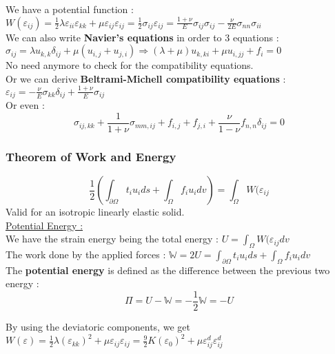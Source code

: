 \documentclass[../main.tex]{subfiles}
\begin{document}
We have a potential function : $W(\varepsilon_{ij}) = \frac{1}{2} \lambda \varepsilon_{ii} \varepsilon_{kk} + \mu \varepsilon_{ij} \varepsilon_{ij} = \frac{1}{2}\sigma_{ij} \varepsilon_{ij} = \frac{1+\nu}{E}\sigma_{ij}\sigma_{ij} - \frac{\nu}{2E}\sigma_{nn} \sigma_{ii} $\\

We can also write \textbf{Navier's equations} in order to 3 equations : $\sigma_{ij} = \lambda u_{k,k}\delta_{ij} + \mu(u_{i,j} + u_{j,i}) \Rightarrow (\lambda +\mu) u_{k,ki} + \mu u_{i,jj} + f_i = 0$\\
\warning No need anymore to check for the compatibility equations.\\


Or we can derive \textbf{Beltrami-Michell compatibility equations} : $\varepsilon_{ij} = -\frac{\nu}{E}\sigma_{kk} \delta_{ij} + \frac{1+\nu}{E}\sigma_{ij}$\\
Or even : \begin{equation}
    \sigma_{ij,kk} + \frac{1}{1+\nu} \sigma_{mm,ij} + f_{i,j} + f_{j,i} + \frac{\nu}{1-\nu} f_{n,n} \delta_{ij}=0
\end{equation}


\subsubsection{Theorem of Work and Energy}
\begin{equation}
    \frac{1}{2}(\int_{\partial \Omega} t_i u_i ds + \int_{\Omega} f_i u_i dv) = \int_\Omega W(\varepsilon_{ij}
\end{equation}
Valid for an isotropic linearly elastic solid.\\

\quad \underline{Potential Energy :}\\

We have the strain energy being the total energy : $U = \int_\Omega W(\varepsilon_{ij} dv$\\

The work done by the applied forces : $\mathbb{W} = 2U = \int_{\partial \Omega} t_i u_ids + \int_\Omega f_iu_i dv$\\

The \textbf{potential energy} is defined as the difference between the previous two energy : \begin{equation}
    \Pi = U-\mathbb{W} = -\frac{1}{2} \mathbb{W} = -U
\end{equation}

By using the deviatoric components, we get $W(\varepsilon) = \frac{1}{2}\lambda (\varepsilon_{kk})^2+ \mu \varepsilon_{ij} \varepsilon_{ij} = \frac{9}{2} K(\varepsilon_0)^2 + \mu \varepsilon_{ij}^d \varepsilon_{ij}^d$\\
\end{document}
